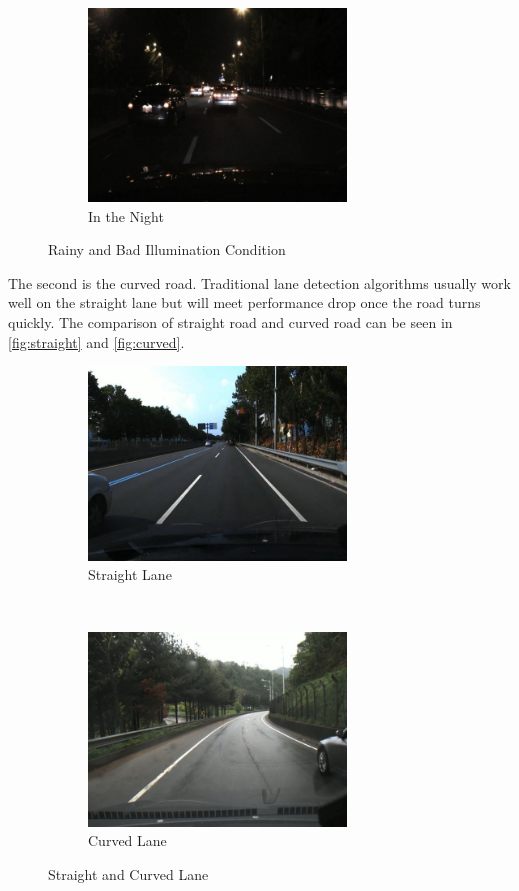 \begin{spacing}{1.5}
\begin{figure}[th]
    ~
    \begin{subfigure}[b]{0.49\textwidth}
        \centering
        \includegraphics[width=2.7in, fbox]{Chapter1/night.png}
        \caption{In the Night}
        \label{fig:night} 
    \end{subfigure}
    \caption{Rainy and Bad Illumination Condition}
\end{figure}

The second is the curved road. Traditional lane detection algorithms usually work well on the straight lane but will meet performance drop once the road turns quickly. The comparison of straight road and curved road can be seen in \autoref{fig:straight} and \autoref{fig:curved}.

\begin{figure}[th]
    \centering
    \begin{subfigure}[b]{0.49\textwidth}
        \centering
        \includegraphics[width=2.7in, fbox]{Chapter1/straight.png}
        \caption{Straight Lane}
        \label{fig:straight} 
    \end{subfigure}%
    ~
    \begin{subfigure}[b]{0.49\textwidth}
        \centering
        \includegraphics[width=2.7in, fbox]{Chapter1/curved.png}
        \caption{Curved Lane}
        \label{fig:curved} 
    \end{subfigure}
    \caption{Straight and Curved Lane}
\end{figure}


\end{spacing}
